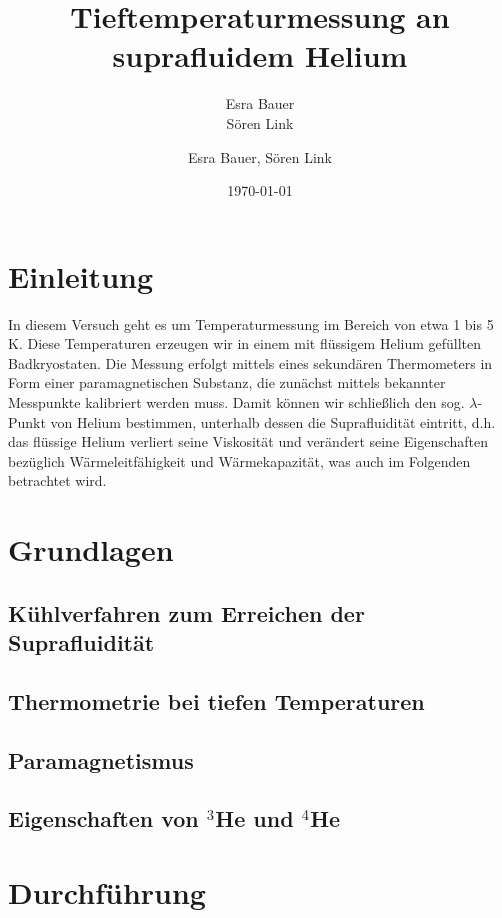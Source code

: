 \documentclass[bigchapter,colorback,accentcolor=tud4b,linedtoc,11pt]{tudreport}
\title{Tieftemperaturmessung an suprafluidem Helium}
\subtitle{Esra Bauer \\Sören Link}
\author{Esra Bauer, Sören Link}
\date{\today}
\begin{document}

\maketitle

\tableofcontents


\chapter{Einleitung}

In diesem Versuch geht es um Temperaturmessung im Bereich von etwa 1 bis 5 K. Diese Temperaturen erzeugen wir in einem mit flüssigem Helium gefüllten Badkryostaten. Die Messung erfolgt mittels eines sekundären Thermometers in Form einer paramagnetischen Substanz, die zunächst mittels bekannter Messpunkte kalibriert werden muss. Damit können wir schließlich den sog. $\lambda$-Punkt von Helium bestimmen, unterhalb dessen die Suprafluidität eintritt, d.h. das flüssige Helium verliert seine Viskosität und verändert seine Eigenschaften bezüglich Wärmeleitfähigkeit und Wärmekapazität, was auch im Folgenden betrachtet wird.

\chapter{Grundlagen}

\section{Kühlverfahren zum Erreichen der Suprafluidität}

\section{Thermometrie bei tiefen Temperaturen}

\section{Paramagnetismus}

\section{Eigenschaften von $^3$He und $^4$He}

\chapter{Durchführung}
\end{document}

